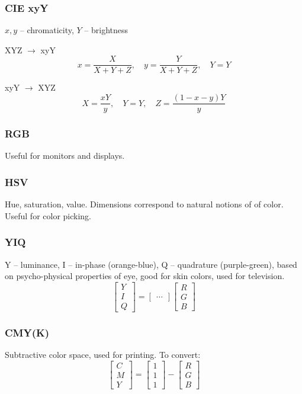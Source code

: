 \documentclass[a4paper,10pt]{article}
\begin{document}
\subsubsection{CIE xyY}
\(x, y\) -- chromaticity, \(Y\) -- brightness
\begin{subbox}{XYZ \(\to\) xyY}
    \[x = \frac{X}{X + Y + Z}, \quad y = \frac{Y}{X + Y +Z}, \quad Y = Y\]
\end{subbox}
\begin{subbox}{xyY \(\to\) XYZ}
    \[X = \frac{xY}{y}, \quad Y = Y, \quad Z = \frac{(1 - x - y)Y}{y}\]
\end{subbox}

\subsubsection{RGB}
Useful for monitors and displays.

\subsubsection{HSV}
Hue, saturation, value. Dimensions correspond to natural notions of  of color. Useful for color picking.

\subsubsection{YIQ}
Y -- luminance, I -- in-phase (orange-blue), Q -- quadrature (purple-green), based on psycho-physical properties of eye, good for skin colors, used for television.
\[\left[\begin{smallmatrix} Y \\ I \\ Q \end{smallmatrix}\right] = \left[\begin{smallmatrix} \dots \end{smallmatrix}\right] \left[\begin{smallmatrix} R \\ G \\ B \end{smallmatrix}\right]\]

\subsubsection{CMY(K)}
Subtractive color space, used for printing. To convert:
\[\left[\begin{smallmatrix} C \\ M \\ Y \end{smallmatrix}\right] = \left[\begin{smallmatrix} 1 \\ 1 \\ 1 \end{smallmatrix}\right] - \left[\begin{smallmatrix} R \\ G \\ B \end{smallmatrix}\right]\]
\end{document}
